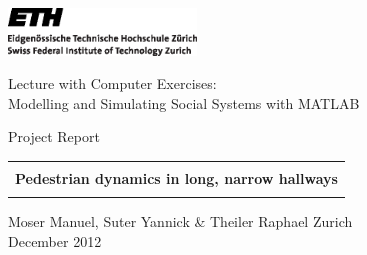\thispagestyle{empty}

\begin{center}
\includegraphics[width=5cm]{ETHlogo.eps}

\bigskip
\bigskip
\bigskip


\LARGE{ 	Lecture with Computer Exercises:\\ }
\LARGE{ Modelling and Simulating Social Systems with MATLAB\\}

\bigskip
\bigskip

\small{Project Report}\\

\bigskip
\bigskip
\bigskip
\bigskip


\begin{tabular}{|c|}
\hline
\\
\textbf{\LARGE{Pedestrian dynamics in long, narrow hallways}}\\
\\
\hline
\end{tabular}

\bigskip
\bigskip
\bigskip

\LARGE{Moser Manuel, Suter Yannick \& Theiler Raphael}
\vfill
Zurich\\
December 2012\\

\end{center}